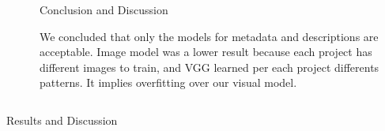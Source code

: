 \documentclass[final]{beamer}
\newlength{\sepwid}
\newlength{\onecolwid}
\newlength{\twocolwid}
\begin{document}
\begin{frame}[t]
\begin{columns}[t]
\begin{column}{\twocolwid}
\begin{columns}[t,totalwidth=\twocolwid]
\begin{column}{\onecolwid}
		\end{column} %
		\begin{column}{\sepwid}\end{column}
		
		\begin{column}{\onecolwid}\vspace{-0.6in} %
			
			
		\begin{block}{Conclusion and Discussion}
			
			We concluded that only the models for metadata and descriptions are acceptable. Image model was a lower result because each project has different images to train, and VGG learned per each project differents patterns. It implies overfitting over our visual model.
		\end{block}
			
			
		\end{column} %
		
	\end{columns} %
	
	
	
	
	\begin{columns}[t,totalwidth=\twocolwid] %
		
		\begin{column}{\onecolwid}\vspace{-.6in} %
			
			
			\begin{block}{Results and Discussion}
				

\end{block}
\end{column}
\end{columns}
\end{column}
\end{columns}
\end{frame}
\end{document}
